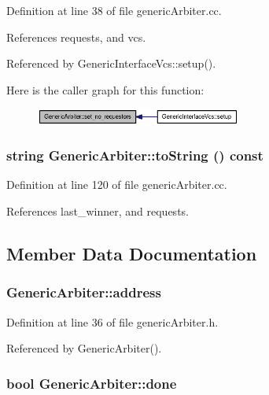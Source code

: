 Definition at line 38 of file genericArbiter.cc.

References requests, and vcs.

Referenced by GenericInterfaceVcs::setup().

Here is the caller graph for this function:\nopagebreak
\begin{figure}[H]
\begin{center}
\leavevmode
\includegraphics[width=191pt]{classGenericArbiter_3994d2b032f4774b73c923c78c05d81a_icgraph}
\end{center}
\end{figure}
\subsubsection[{toString}]{\setlength{\rightskip}{0pt plus 5cm}string GenericArbiter::toString () const}\label{classGenericArbiter_dfd7645d22ce13eb428e73fd9fa34b63}




Definition at line 120 of file genericArbiter.cc.

References last\_\-winner, and requests.

\subsection{Member Data Documentation}
\subsubsection[{address}]{ {\bf GenericArbiter::address}}\label{classGenericArbiter_d570be8e0435c540c11f46cd9e68d8fc}




Definition at line 36 of file genericArbiter.h.

Referenced by GenericArbiter().
\subsubsection[{done}]{\setlength{\rightskip}{0pt plus 5cm}bool {\bf GenericArbiter::done}\hspace{0.3cm}{\tt  [private]}}\label{classGenericArbiter_b7f37783b4ef2d2ba15ed6e12b493e91}




